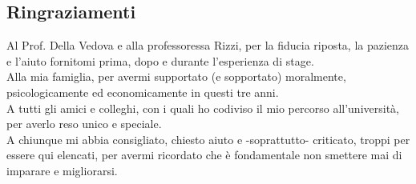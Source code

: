 

\cleardoublepage
\begingroup
\let\clearpage\endgroup
\null{}

\begin{flushright}
\begin{minipage}{5.3in}
\begin{flushright}
\begin{em}
\section*{Ringraziamenti}

Al Prof. Della Vedova e alla professoressa Rizzi,
per la fiducia riposta, la pazienza e l'aiuto fornitomi prima, dopo e durante l'esperienza di stage.
\\
Alla mia famiglia,
per avermi supportato (e sopportato) moralmente, psicologicamente ed economicamente in questi tre anni.
\\ 
A tutti gli amici e colleghi, con i quali ho codiviso il mio percorso all'università, per averlo reso unico e speciale.
\\
A chiunque mi abbia consigliato, chiesto aiuto e -soprattutto- criticato, troppi per essere qui elencati, per avermi ricordato che è fondamentale non smettere mai di imparare e migliorarsi.

\end{em}
\end{flushright}
\end{minipage}
\end{flushright}
 \null
